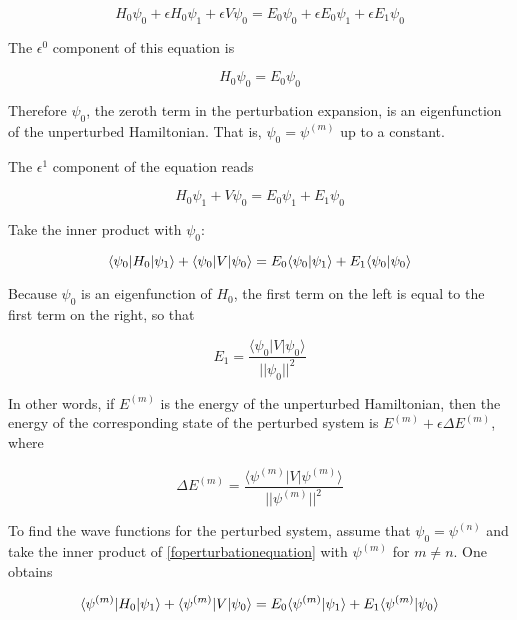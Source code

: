 \begin{equation}
H_0\psi_0 + \epsilon H_0 \psi_1 + \epsilon V\psi_0
 =
E_0\psi_0 + \epsilon E_0 \psi_1 + \epsilon E_1 \psi_0
\end{equation}

The $\epsilon^0$ component of this equation is


\begin{equation}
H_0\psi_0 =
E_0\psi_0
\end{equation}

Therefore $\psi_0$, the zeroth term in the perturbation expansion, is an eigenfunction of the unperturbed Hamiltonian.  That is, $\psi_0 = \psi^{(m)}$ up to  a constant.

The $\epsilon^1$ component of the equation reads

\begin{equation}
\label{foperturbationequation}
 H_0 \psi_1 + V\psi_0
 =
 E_0 \psi_1 +  E_1 \psi_0
\end{equation}


Take the inner product with $\psi_0$:

\begin{equation}
 \langle \psi_0 | H_0  | \psi_1\rangle +  \langle \psi_0  | V | \psi_0 \rangle
 =
 E_0 \langle \psi_0  |  \psi_1 \rangle +  E_1 \langle \psi_0  |  \psi_0 \rangle
\end{equation}

Because $\psi_0$ is an eigenfunction of $H_0$, the first term on the left is equal to the first term on the right, so that

\begin{equation}
\label{perturbation-of-energy}
E_1 =\frac{ \langle\psi_0 | V | \psi_0\rangle}{ ||\psi_0||^2 }
\end{equation}

In other words, if $E^{(m)}$ is the energy of the unperturbed Hamiltonian, then the energy of the corresponding state of the perturbed system is $E^{(m)} + \epsilon \Delta E^{(m)}$, where

\begin{equation}
\label{perturbation-of-En}
\Delta E^{(m)} =\frac{\langle \psi^{(m)} | V | \psi^{(m)} \rangle }{ || \psi^{(m)} ||^2 }
\end{equation}

To find the wave functions for the perturbed system, assume that $\psi_0 = \psi^{(n)}$ and take the inner product of \eqref{foperturbationequation} with $\psi^{(m)}$ for $m \ne n$.  One obtains

\begin{equation}
\langle \psi^{(m)} | H_0 | \psi_1 \rangle + \langle \psi^{(m)} | V | \psi_0 \rangle
  =
E_0\langle \psi^{(m)} | \psi_1 \rangle + E_1\langle \psi^{(m)} | \psi_0 \rangle
\end{equation}

